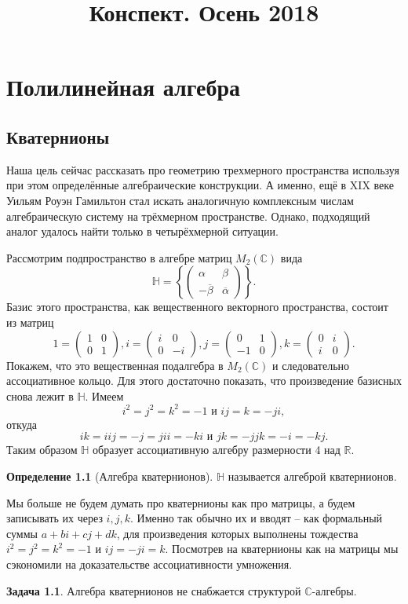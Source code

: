 \documentclass[10pt,a4paper,oneside]{book}
\theoremstyle{definition}
\newtheorem{zad}{{\color{violet!100!black} Задача}}
\newtheorem*{defn}{{\color{yellow!30!red} Определение}}
\newcommand{\mb}[1]{\mathbb{#1}}
\newcommand{\ovl}{\overline}
\def\dfn{\begin{defn}}
\def\edfn{\end{defn}}
\def\zd{\begin{zad}}
\def\ezd{\end{zad}}
\def\pmat{\begin{pmatrix}}
\def\epmat{\end{pmatrix}}
\begin{document}
\title{Конспект. Осень 2018}
\date{}
\author{}
\maketitle
\tableofcontents



\chapter{Полилинейная алгебра}
\section{Кватернионы}

Наша цель сейчас рассказать про геометрию трехмерного пространства используя при этом определённые алгебраические конструкции. А именно, ещё в XIX веке Уильям Роуэн Гамильтон стал искать аналогичную комплексным числам алгебраическую систему на трёхмерном пространстве.  
Однако, подходящий аналог удалось найти только в четырёхмерной ситуации.


Рассмотрим подпространство в алгебре матриц $M_2(\mb C)$ вида
$$\mb H = \left\{\pmat \alpha & \beta \\ -\ovl{\beta} & \ovl{\alpha} \epmat \right\}.$$
Базис этого пространства, как вещественного векторного пространства, состоит из матриц 
$$ 1=\pmat 1 & 0 \\ 0& 1 \epmat, i= \pmat i & 0 \\ 0& -i \epmat, j=\pmat 0& 1 \\ -1 & 0 \epmat, k=\pmat 0 & i \\ i & 0\epmat. $$ 
Покажем, что это вещественная подалгебра в $M_2(\mb C)$ и следовательно ассоциативное кольцо. 
Для этого достаточно показать, что произведение базисных снова лежит в $\mb H$. Имеем $$i^2=j^2=k^2=-1 \text{ и } ij=k=-ji,$$ откуда $$ik= iij=-j=jii=-ki \text{ и } jk=-jjk=-i=-kj.$$ Таким образом $\mb H$ образует ассоциативную алгебру размерности 4 над $\mb R$.
 
\dfn[Алгебра кватернионов] $\mb H$ называется алгеброй кватернионов. 
\edfn
Мы больше не будем думать про кватернионы как про матрицы, а будем записывать их через $i,j,k$. Именно так обычно их и вводят -- как формальный суммы $a+bi+cj+dk$, для произведения которых выполнены тождества $i^2=j^2=k^2=-1$ и $ij=-ji=k$. Посмотрев на кватернионы как на матрицы мы сэкономили на доказательстве ассоциативности умножения.

\zd Алгебра кватернионов не снабжается структурой $\mb C$-алгебры.
\ezd
\end{document}
